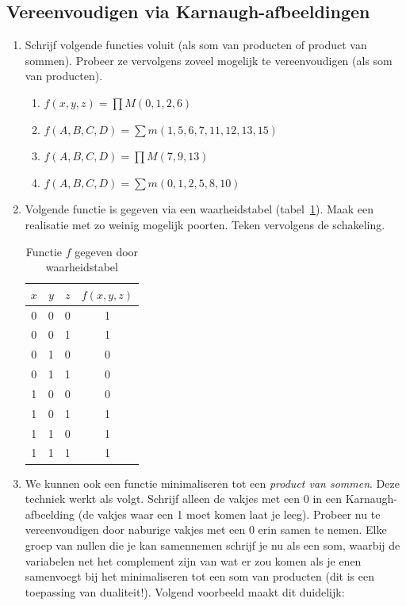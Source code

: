 \subsection{Vereenvoudigen via Karnaugh-afbeeldingen}
\begin{enumerate}
\item Schrijf volgende functies voluit (als som van producten of product van sommen). Probeer ze vervolgens zoveel mogelijk te vereenvoudigen (als som van producten).
\begin{enumerate}
\item $f(x, y, z) = \prod M(0, 1, 2, 6)$
\item $f(A, B, C, D) = \sum m(1, 5, 6, 7, 11, 12, 13, 15)$
\item $f(A, B, C, D) = \prod M(7, 9, 13)$
\item $f(A, B, C, D) = \sum m(0, 1, 2, 5, 8, 10)$
\end{enumerate}

\item Volgende functie is gegeven via een waarheidstabel (tabel~\ref{tbl:f2}). Maak een realisatie met zo weinig mogelijk poorten. Teken vervolgens de schakeling.
\begin{table}[htb]
  \centering
\begin{tabular}{|ccc|c|}
\hline
$x$  & $y$ & $z$ & $f(x,y,z)$ \\ \hline \hline
0 & 0  & 0 & 1 \\
0 & 0  & 1 & 1\\ 
0 & 1  & 0 & 0\\
0 & 1  & 1 & 0\\
1 & 0  & 0 & 0 \\
1 & 0  & 1 & 1\\ 
1 & 1  & 0 & 1\\
1 & 1  & 1 & 1\\

\hline
\end{tabular}
  \caption{Functie $f$ gegeven door waarheidstabel}\label{tbl:f2}
\end{table}

\item We kunnen ook een functie minimaliseren tot een \emph{product van sommen}. Deze techniek werkt als volgt. Schrijf alleen de vakjes met een 0 in een Karnaugh-afbeelding (de vakjes waar een 1 moet komen laat je leeg). Probeer nu te vereenvoudigen door naburige vakjes met een 0 erin samen te nemen. Elke groep van nullen die je kan samennemen schrijf je nu als een som, waarbij de variabelen net het complement zijn van wat er zou komen als je enen samenvoegt bij het minimaliseren tot een som van producten (dit is een toepassing van dualiteit!). Volgend voorbeeld maakt dit duidelijk:


\end{enumerate}
